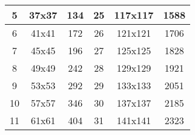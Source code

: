 \begin{appendix}
\begin{table}[htbp]
\begin{tabular}{|c|c|c|c|c|c|}
			5                & 37x37                                                            & 134                                                                          & 25               & 117x117                                                          & 1588                                                                          \\ \hline
			6                & 41x41                                                            & 172                                                                          & 26               & 121x121                                                          & 1706                                                                          \\ \hline
			7                & 45x45                                                            & 196                                                                          & 27               & 125x125                                                          & 1828                                                                          \\ \hline
			8                & 49x49                                                            & 242                                                                          & 28               & 129x129                                                          & 1921                                                                          \\ \hline
			9                & 53x53                                                            & 292                                                                          & 29               & 133x133                                                          & 2051                                                                          \\ \hline
			10               & 57x57                                                            & 346                                                                          & 30               & 137x137                                                          & 2185                                                                          \\ \hline
			11               & 61x61                                                            & 404                                                                          & 31               & 141x141                                                          & 2323                                                                          \\ \hline

\end{tabular}
\end{table}
\end{appendix}
